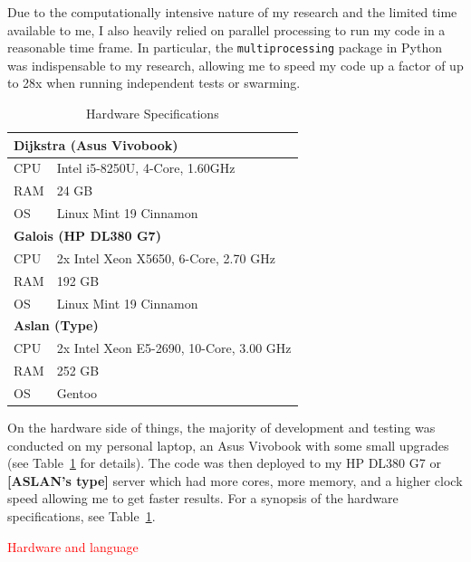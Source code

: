 \documentclass[oneside,12pt,openany]{book}
\begin{document}
	Due to the computationally intensive nature of my research and the limited time available to me, I also heavily relied on parallel processing to run my code in a reasonable time frame. In particular, the \texttt{multiprocessing} package in Python was indispensable to my research, allowing me to speed my code up a factor of up to 28x when running independent tests or swarming.
	
	\begin{table}[!ht]
		\centering
		\begin{tabular}{|l|l|}
			\hline
			\multicolumn{2}{|l|}{\textbf{Dijkstra (Asus Vivobook)}} \\ \hline
			CPU     & Intel i5-8250U, 4-Core, 1.60GHz     \\ \hline
			RAM     & 24 GB                                \\ \hline
			OS      & Linux Mint 19 Cinnamon               \\ \hline
			\multicolumn{2}{|l|}{\textbf{Galois (HP DL380 G7)}}     \\ \hline
			CPU     &  2x Intel Xeon X5650, 6-Core, 2.70 GHz       \\ \hline
			RAM     & 192 GB                               \\ \hline
			OS      & Linux Mint 19 Cinnamon               \\ \hline
			\multicolumn{2}{|l|}{\textbf{Aslan (Type)}}                         \\ \hline
			CPU&    2x  Intel Xeon E5-2690, 10-Core, 3.00 GHz    \\ \hline
			RAM&    252 GB                                  \\ \hline
			OS&    Gentoo                               \\ \hline
		\end{tabular}
		\caption{Hardware Specifications}
		\label{tab:hardware}
	\end{table}

	On the hardware side of things, the majority of development and testing was conducted on my personal laptop, an Asus Vivobook with some small upgrades (see Table~\ref{tab:hardware} for details). The code was then deployed to my HP DL380 G7 or \textbf{[ASLAN's type]} server which had more cores, more memory, and a higher clock speed allowing me to get faster results. For a synopsis of the hardware specifications, see Table~\ref{tab:hardware}. 
	
	\textcolor{red}{Hardware and language}
	
\end{document}

